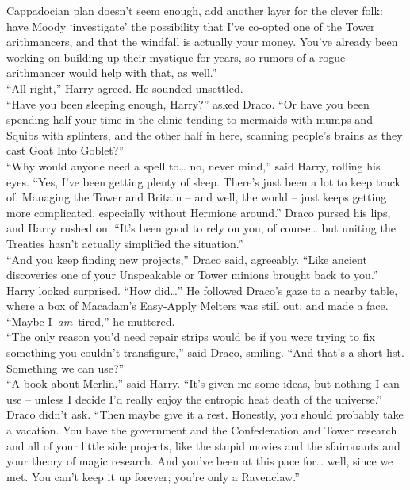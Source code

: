 Cappadocian plan doesn't seem enough, add another layer for the clever
folk: have Moody `investigate' the possibility that I've co-opted one of
the Tower arithmancers, and that the windfall is actually your money.
You've already been working on building up their mystique for years, so
rumors of a rogue arithmancer would help with that, as well.'' \\
``All right,'' Harry agreed. He sounded unsettled. \\
``Have you been sleeping enough, Harry?'' asked Draco. ``Or have you
been spending half your time in the clinic tending to mermaids with
mumps and Squibs with splinters, and the other half in here, scanning
people's brains as they cast Goat Into Goblet?'' \\
``Why would anyone need a spell to\ldots{} no, never mind,'' said Harry,
rolling his eyes. ``Yes, I've been getting plenty of sleep. There's just
been a lot to keep track of. Managing the Tower and Britain -- and well,
the world -- just keeps getting more complicated, especially without
Hermione around.'' Draco pursed his lips, and Harry rushed on. ``It's
been good to rely on you, of course\ldots{} but uniting the Treaties
hasn't actually simplified the situation.'' \\
``And you keep finding new projects,'' Draco said, agreeably. ``Like
ancient discoveries one of your Unspeakable or Tower minions brought
back to you.'' \\
Harry looked surprised. ``How did\ldots{}'' He followed Draco's gaze to
a nearby table, where a box of Macadam's Easy-Apply Melters was still
out, and made a face. ``Maybe I~\emph{am}~tired,'' he muttered. \\
``The only reason you'd need repair strips would be if you were trying
to fix something you couldn't transfigure,'' said Draco, smiling. ``And
that's a short list. Something we can use?'' \\
``A book about Merlin,'' said Harry. ``It's given me some ideas, but
nothing I can use -- unless I decide I'd really enjoy the entropic heat
death of the universe.'' \\
Draco didn't ask. ``Then maybe give it a rest. Honestly, you should
probably take a vacation. You have the government and the Confederation
and Tower research and all of your little side projects, like the stupid
movies and the sfaironauts and your theory of magic research. And you've
been at this pace for\ldots{} well, since we met. You can't keep it up
forever; you're only a Ravenclaw.'' \\
